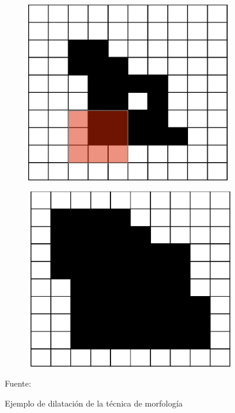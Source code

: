 \begin{figure}[ht]
	\centering
	\captionsetup{justification=centering}
	\begin{subfigure}[t]{2.5in}
		\centering
		\includegraphics[width=.8\textwidth]{./imagenes/morphology1-1}
		\label{morphology1.1}
	\end{subfigure}	
	\begin{subfigure}[t]{2.5in}
		\centering
		\includegraphics[width=.8\textwidth]{./imagenes/morphology1-2}
		\label{morphology1.2}
	\end{subfigure}
	\caption{Ejemplo de dilataci\'{o}n de la t\'{e}cnica de morfolog\'{i}a}
	\vspace{2 mm}
	Fuente: \cite{eri2015}
	\label{morphology1}
\end{figure}

